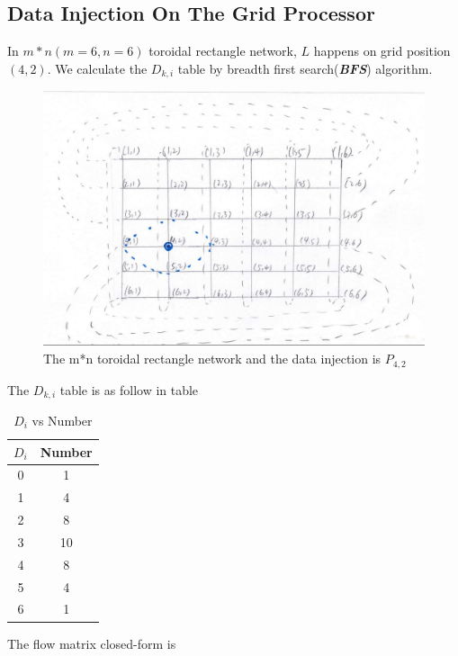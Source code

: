 \subsection{Data Injection On The Grid Processor}
In $m*n (m = 6,  n = 6)$  toroidal rectangle network, $L$ happens on grid position $(4, 2)$.  We calculate the $D_{k,i}$ table  by breadth first search(\textbf{\textit{BFS}}) algorithm.  

\begin{figure}[!ht]
\centering
\includegraphics[width=1\columnwidth]{figure/rt0.JPG}
\caption{The m*n toroidal rectangle network and the data injection is $P_{4, 2}$}
\label{fig:rt0}
\end{figure}
\newpage 

The $D_{k,i}$ table is as follow in table 
\begin{table}
\centering
\small
\setlength\tabcolsep{2pt}
\begin{tabular}{|c|c|}
\hline
    $D_{i}$ & Number\\ 
    \hline
    0 & 1 \\ \hline
    1 & 4 \\ \hline
    2 & 8\\ \hline
    3 & 10\\ \hline
    4 & 8 \\ \hline
    5 & 4 \\ \hline
    6 & 1\\
\hline
\end{tabular}
\caption{$D_{i}$ vs Number}
\label{tab:rt}
\end{table}


The flow matrix closed-form is 

